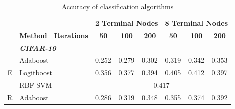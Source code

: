 \documentclass[12pt]{article}
\begin{document}
\begin{sloppypar}
\begin{table}[hbt!]
\centering
\caption{Accuracy of classification algorithms}
\label{tab:result-table}
\begin{tabular}{lllllllll}
\hline
                                       & \textbf{}       & \multicolumn{1}{c}{\textbf{}}           & \multicolumn{3}{c}{\textbf{2 Terminal Nodes}}                                                         & \multicolumn{3}{c}{\textbf{8 Terminal Nodes}}                                                         \\
                                       & \textbf{Method} & \multicolumn{1}{c}{\textbf{Iterations}} & \multicolumn{1}{c}{\textbf{50}} & \multicolumn{1}{c}{\textbf{100}} & \multicolumn{1}{c}{\textbf{200}} & \multicolumn{1}{c}{\textbf{50}} & \multicolumn{1}{c}{\textbf{100}} & \multicolumn{1}{c}{\textbf{200}} \\ \hline
                                       & \multicolumn{2}{l}{\textit{\textbf{CIFAR-10}}}            &                                 &                                  &                                  &                                 &                                  &                                  \\
\multicolumn{1}{c}{\multirow{3}{*}{E}} & \multicolumn{2}{l}{Adaboost}                              & 0.252                           & 0.279                            & 0.302                            & 0.319                           & 0.342                            & 0.353                            \\
\multicolumn{1}{c}{}                   & \multicolumn{2}{l}{Logitboost}                            & 0.356                           & 0.377                            & 0.394                            & 0.405                           & 0.412                            & 0.397                            \\
\multicolumn{1}{c}{}                   & \multicolumn{2}{l}{RBF SVM}                               & \multicolumn{6}{c}{0.417}                                                                                                                                                                                     \\
\multirow{3}{*}{R}                     & \multicolumn{2}{l}{Adaboost}                              & 0.286                           & 0.319                            & 0.348                            & 0.355                           & 0.374                            & 0.392                            \\

\end{tabular}
\end{table}
\end{sloppypar}
\end{document}
